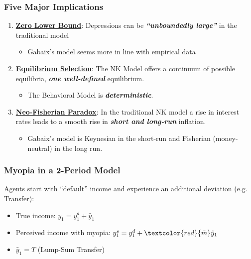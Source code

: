 \documentclass{beamer}
\begin{document}

\begin{frame}
	\frametitle{Five Major Implications}
	\begin{enumerate}
		\item \textbf{\underline{Zero Lower Bound}}: Depressions can be \textit{\textbf{``unboundedly large''}} in the traditional model
		\begin{itemize}
			\item Gabaix's model seems more in line with empirical data
		\end{itemize}
		\vspace{15pt}
		\item \textbf{\underline{Equilibrium Selection}}: The NK Model offers a continuum of possible equilibria, \textit{\textbf{one well-defined}} equilibrium.
		\begin{itemize}
			\item The Behavioral Model is \textit{\textbf{deterministic}}.
		\end{itemize}
		\vspace{8pt}
		\item \underline{\textbf{Neo-Fisherian Paradox}}: In the traditional NK model a rise in interest rates leads to a smooth rise in \textit{\textbf{short and long-run}} inflation.
		\begin{itemize}
			\item Gabaix's model is Keynesian in the short-run and Fisherian (money-neutral) in the long run.
		\end{itemize} 
	\end{enumerate}
\end{frame}


\begin{frame}
	\frametitle{Myopia in a 2-Period Model}
	Agents start with ``default'' income and experience an additional deviation (e.g. Transfer):
\vspace{8pt}
	\begin{itemize}
		\item True income: $y_{1}=y_{1}^{d}+\hat y_{1}$
		\item Perceived income with myopia:
	 $y_{1}^{s}=y_{1}^{d}+\textcolor{red}{\bar m}\hat y_{1}$
		\vspace{10pt}
		\item $\hat y_{1}=T$ (Lump-Sum Transfer)
	\end{itemize}	
\end{frame}
\end{document}
